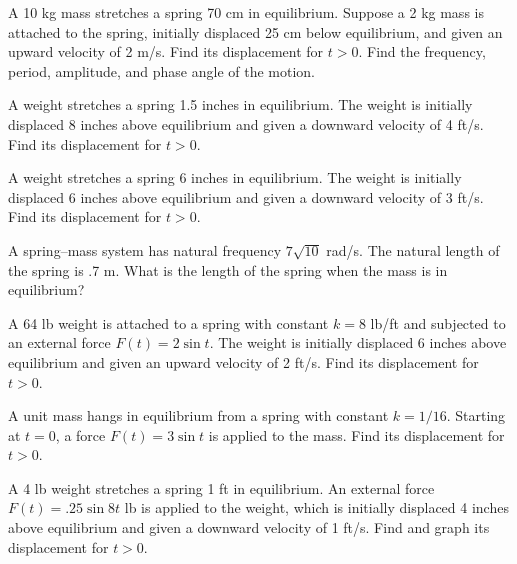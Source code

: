 \documentclass{ximera}
\begin{document}
\begin{problem}\label{exer:6.1.6}
A 10 kg mass stretches a spring 70 cm in equilibrium. Suppose a 2
kg mass is
attached to the spring, initially displaced 25 cm below equilibrium,
and given an upward velocity of 2 m/s. Find its displacement for
$t>0$. Find the frequency, period, amplitude, and phase angle of the
motion.
\end{problem}

\begin{problem}\label{exer:6.1.7}
A  weight stretches a spring 1.5 inches in equilibrium. The weight
is initially displaced 8 inches above equilibrium and given a downward
velocity of 4 ft/s. Find its displacement for $t > 0$.
\end{problem}

\begin{problem}\label{exer:6.1.8}
A weight stretches a spring 6 inches in equilibrium. The weight is
initially displaced 6 inches above equilibrium and given a downward
velocity of 3 ft/s. Find its displacement for $t>0$.
\end{problem}

\begin{problem}\label{exer:6.1.9}
A spring--mass system has natural frequency $7\sqrt{10}$ rad/s. The
natural length of the spring is .7 m. What is the length of the spring
when the mass is in equilibrium?
\end{problem}

\begin{problem}\label{exer:6.1.10}
A 64 lb weight is attached to a spring with constant $k=8$ lb/ft and
subjected to an external force $F(t)=2\sin t$. The weight is initially
displaced 6 inches above equilibrium and given an upward velocity of 2
ft/s. Find its displacement for $t>0$.
\end{problem}

\begin{problem}\label{exer:6.1.11}
A unit mass hangs in equilibrium from a spring with constant $k=1/16$.
Starting at $t=0$, a force $F(t)=3\sin t$ is applied to the mass. Find
its displacement for $t>0$.
\end{problem}

\begin{problem}\label{exer:6.1.12} 
A 4 lb weight stretches a spring 1 ft in equilibrium. An external
force $F(t)=.25\sin8 t$ lb is applied to the weight, which is
initially displaced 4 inches above equilibrium and given a downward
velocity of 1 ft/s. Find and graph its displacement for $t>0$.
\end{problem}
\end{document}
